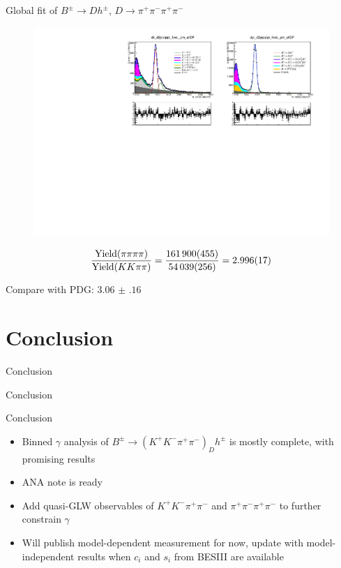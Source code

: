 \documentclass{beamer}
\begin{document}
\begin{frame}{Global fit of $B^\pm\to Dh^\pm$, $D\to\pi^+\pi^-\pi^+\pi^-$}
  \vspace{-0.3cm}
  \begin{figure}
    \centering
    \includegraphics[width = 1.0\textwidth]{Plots/d2pipipipi_fiveL_allDP.pdf}
  \end{figure}
  \vspace{-0.2cm}
  \begin{equation*}
    \frac{{\rm Yield}(\pi\pi\pi\pi)}{{\rm Yield}(KK\pi\pi)} = \frac{\SI{161900(455)}{}}{\SI{54039(256)}{}} = \SI{2.996(17)}{}
  \end{equation*}
  \begin{center}
    Compare with PDG: $\SI{3.06(16)}{}$
  \end{center}
\end{frame}

\section{Conclusion}
\begin{frame}{Conclusion}
  \begin{center}
    {\huge Conclusion}
  \end{center}
\end{frame}

\begin{frame}{Conclusion}
  \begin{itemize}
    \setlength\itemsep{2em}
    \item{Binned $\gamma$ analysis of $B^\pm\to(K^+K^-\pi^+\pi^-)_Dh^\pm$ is mostly complete, with promising results}
    \item{ANA note is ready}
    \item{Add quasi-GLW observables of $K^+K^-\pi^+\pi^-$ and $\pi^+\pi^-\pi^+\pi^-$ to further constrain $\gamma$}
    \item{Will publish model-dependent measurement for now, update with model-independent results when $c_i$ and $s_i$ from BESIII are available}
  \end{itemize}
\end{frame}
\end{document}
